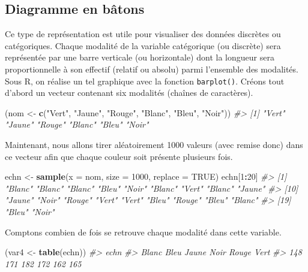 \documentclass[]{article}
\newenvironment{Shaded}{\begin{snugshade}}{\end{snugshade}}
\newcommand{\CommentTok}[1]{\textcolor[rgb]{0.56,0.35,0.01}{\textit{#1}}}
\newcommand{\DataTypeTok}[1]{\textcolor[rgb]{0.13,0.29,0.53}{#1}}
\newcommand{\DecValTok}[1]{\textcolor[rgb]{0.00,0.00,0.81}{#1}}
\newcommand{\KeywordTok}[1]{\textcolor[rgb]{0.13,0.29,0.53}{\textbf{#1}}}
\newcommand{\NormalTok}[1]{#1}
\newcommand{\OperatorTok}[1]{\textcolor[rgb]{0.81,0.36,0.00}{\textbf{#1}}}
\newcommand{\OtherTok}[1]{\textcolor[rgb]{0.56,0.35,0.01}{#1}}
\newcommand{\StringTok}[1]{\textcolor[rgb]{0.31,0.60,0.02}{#1}}
\begin{document}
\hypertarget{diagramme-en-buxe2tons}{%
\subsection{Diagramme en bâtons}\label{diagramme-en-buxe2tons}}

Ce type de représentation est utile pour visualiser des données discrètes ou catégoriques. Chaque modalité de la variable catégorique (ou discrète) sera représentée par une barre verticale (ou horizontale) dont la longueur sera proportionnelle à son effectif (relatif ou absolu) parmi l'ensemble des modalités. Sous R, on réalise un tel graphique avec la fonction \texttt{barplot()}.
Créons tout d'abord un vecteur contenant six modalités (chaînes de caractères).

\begin{Shaded}
\begin{Highlighting}[]
\NormalTok{(nom <-}\StringTok{ }\KeywordTok{c}\NormalTok{(}\StringTok{"Vert"}\NormalTok{, }\StringTok{"Jaune"}\NormalTok{, }\StringTok{"Rouge"}\NormalTok{, }\StringTok{"Blanc"}\NormalTok{, }\StringTok{"Bleu"}\NormalTok{, }\StringTok{"Noir"}\NormalTok{))}
\CommentTok{#> [1] "Vert"  "Jaune" "Rouge" "Blanc" "Bleu"  "Noir"}
\end{Highlighting}
\end{Shaded}

Maintenant, nous allons tirer aléatoirement 1000 valeurs (avec remise donc) dans ce vecteur afin que chaque couleur soit présente plusieurs fois.

\begin{Shaded}
\begin{Highlighting}[]
\NormalTok{echn <-}\StringTok{ }\KeywordTok{sample}\NormalTok{(}\DataTypeTok{x =}\NormalTok{ nom, }\DataTypeTok{size =} \DecValTok{1000}\NormalTok{, }\DataTypeTok{replace =} \OtherTok{TRUE}\NormalTok{)}
\NormalTok{echn[}\DecValTok{1}\OperatorTok{:}\DecValTok{20}\NormalTok{]}
\CommentTok{#>  [1] "Blanc" "Blanc" "Blanc" "Bleu"  "Noir"  "Blanc" "Vert"  "Blanc" "Jaune"}
\CommentTok{#> [10] "Jaune" "Noir"  "Rouge" "Vert"  "Vert"  "Bleu"  "Rouge" "Bleu"  "Blanc"}
\CommentTok{#> [19] "Bleu"  "Noir"}
\end{Highlighting}
\end{Shaded}

Comptons combien de fois se retrouve chaque modalité dans cette variable.

\begin{Shaded}
\begin{Highlighting}[]
\NormalTok{(var4 <-}\StringTok{ }\KeywordTok{table}\NormalTok{(echn))}
\CommentTok{#> echn}
\CommentTok{#> Blanc  Bleu Jaune  Noir Rouge  Vert }
\CommentTok{#>   148   171   182   172   162   165}
\end{Highlighting}
\end{Shaded}
\end{document}
